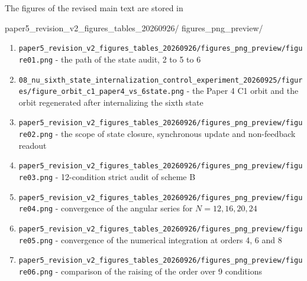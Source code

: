 \documentclass[
  a4paper,
]{article}
\newenvironment{Shaded}{}{}
\newcommand{\NormalTok}[1]{#1}
\providecommand{\tightlist}{%
  \setlength{\itemsep}{0pt}\setlength{\parskip}{0pt}}
\begin{document}
The figures of the revised main text are stored in

\begin{Shaded}
\begin{Highlighting}[]
\NormalTok{paper5\_revision\_v2\_figures\_tables\_20260926/}
\NormalTok{figures\_png\_preview/}
\end{Highlighting}
\end{Shaded}

\begin{enumerate}
\def\labelenumi{\arabic{enumi}.}
\tightlist
\item
  \texttt{paper5\_\allowbreak{}revision\_\allowbreak{}v2\_\allowbreak{}figures\_\allowbreak{}tables\_\allowbreak{}20260926/\allowbreak{}figures\_\allowbreak{}png\_\allowbreak{}preview/\allowbreak{}figure01.png}
  - the path of the state audit, 2 to 5 to 6
\item
  \texttt{08\_\allowbreak{}nu\_\allowbreak{}sixth\_\allowbreak{}state\_\allowbreak{}internalization\_\allowbreak{}control\_\allowbreak{}experiment\_\allowbreak{}20260925/\allowbreak{}figures/\allowbreak{}figure\_\allowbreak{}orbit\_\allowbreak{}c1\_\allowbreak{}paper4\_\allowbreak{}vs\_\allowbreak{}6state.png}
  - the Paper 4 C1 orbit and the orbit regenerated after internalizing
  the sixth state
\item
  \texttt{paper5\_\allowbreak{}revision\_\allowbreak{}v2\_\allowbreak{}figures\_\allowbreak{}tables\_\allowbreak{}20260926/\allowbreak{}figures\_\allowbreak{}png\_\allowbreak{}preview/\allowbreak{}figure02.png}
  - the scope of state closure, synchronous update and non-feedback
  readout
\item
  \texttt{paper5\_\allowbreak{}revision\_\allowbreak{}v2\_\allowbreak{}figures\_\allowbreak{}tables\_\allowbreak{}20260926/\allowbreak{}figures\_\allowbreak{}png\_\allowbreak{}preview/\allowbreak{}figure03.png}
  - 12-condition strict audit of scheme B
\item
  \texttt{paper5\_\allowbreak{}revision\_\allowbreak{}v2\_\allowbreak{}figures\_\allowbreak{}tables\_\allowbreak{}20260926/\allowbreak{}figures\_\allowbreak{}png\_\allowbreak{}preview/\allowbreak{}figure04.png}
  - convergence of the angular series for \(N=12,16,20,24\)
\item
  \texttt{paper5\_\allowbreak{}revision\_\allowbreak{}v2\_\allowbreak{}figures\_\allowbreak{}tables\_\allowbreak{}20260926/\allowbreak{}figures\_\allowbreak{}png\_\allowbreak{}preview/\allowbreak{}figure05.png}
  - convergence of the numerical integration at orders 4, 6 and 8
\item
  \texttt{paper5\_\allowbreak{}revision\_\allowbreak{}v2\_\allowbreak{}figures\_\allowbreak{}tables\_\allowbreak{}20260926/\allowbreak{}figures\_\allowbreak{}png\_\allowbreak{}preview/\allowbreak{}figure06.png}
  - comparison of the raising of the order over 9 conditions
\end{enumerate}
\end{document}
